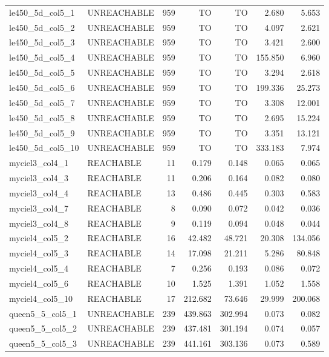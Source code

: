 \begin{tabular}{llr|rrrr}
  le450\_5d\_col5\_1 & UNREACHABLE & 959 & TO & TO & 2.680 & 5.653 \\
  le450\_5d\_col5\_2 & UNREACHABLE & 959 & TO & TO & 4.097 & 2.621 \\
  le450\_5d\_col5\_3 & UNREACHABLE & 959 & TO & TO & 3.421 & 2.600 \\
  le450\_5d\_col5\_4 & UNREACHABLE & 959 & TO & TO & 155.850 & 6.960 \\
  le450\_5d\_col5\_5 & UNREACHABLE & 959 & TO & TO & 3.294 & 2.618 \\
  le450\_5d\_col5\_6 & UNREACHABLE & 959 & TO & TO & 199.336 & 25.273 \\
  le450\_5d\_col5\_7 & UNREACHABLE & 959 & TO & TO & 3.308 & 12.001 \\
  le450\_5d\_col5\_8 & UNREACHABLE & 959 & TO & TO & 2.695 & 15.224 \\
  le450\_5d\_col5\_9 & UNREACHABLE & 959 & TO & TO & 3.351 & 13.121 \\ %
  le450\_5d\_col5\_10 & UNREACHABLE & 959 & TO & TO & 333.183 & 7.974 \\
  myciel3\_col4\_1 & REACHABLE & 11 & 0.179 & 0.148 & 0.065 & 0.065 \\
  myciel3\_col4\_3 & REACHABLE & 11 & 0.206 & 0.164 & 0.082 & 0.080 \\
  myciel3\_col4\_4 & REACHABLE & 13 & 0.486 & 0.445 & 0.303 & 0.583 \\
  myciel3\_col4\_7 & REACHABLE & 8 & 0.090 & 0.072 & 0.042 & 0.036 \\
  myciel3\_col4\_8 & REACHABLE & 9 & 0.119 & 0.094 & 0.048 & 0.044 \\
  myciel4\_col5\_2 & REACHABLE & 16 & 42.482 & 48.721 & 20.308 & 134.056 \\
  myciel4\_col5\_3 & REACHABLE & 14 & 17.098 & 21.211 & 5.286 & 80.848 \\
  myciel4\_col5\_4 & REACHABLE & 7 & 0.256 & 0.193 & 0.086 & 0.072 \\
  myciel4\_col5\_6 & REACHABLE & 10 & 1.525 & 1.391 & 1.052 & 1.558 \\ %
  myciel4\_col5\_10 & REACHABLE & 17 & 212.682 & 73.646 & 29.999 & 200.068 \\
  queen5\_5\_col5\_1 & UNREACHABLE & 239 & 439.863 & 302.994 & 0.073 & 0.082 \\
  queen5\_5\_col5\_2 & UNREACHABLE & 239 & 437.481 & 301.194 & 0.074 & 0.057 \\
  queen5\_5\_col5\_3 & UNREACHABLE & 239 & 441.161 & 303.136 & 0.073 & 0.589 \\

\end{tabular}

